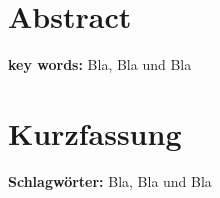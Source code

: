 \chapter*{Abstract}
\label{ch:Abstract}

\textbf{key words:} Bla, Bla und Bla

\newpage






\chapter*{Kurzfassung}
\label{ch:Kurzfassung}

\textbf{Schlagwörter:} Bla, Bla und Bla








